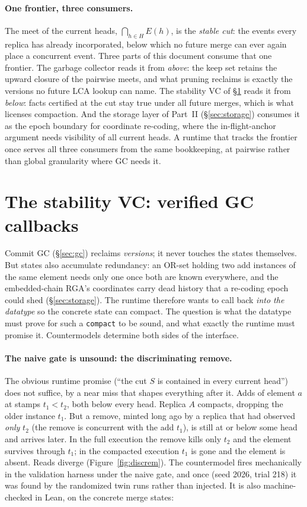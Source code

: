 \documentclass[11pt]{article}
\newcommand{\code}[1]{\texttt{#1}}
\begin{document}
\paragraph{One frontier, three consumers.} The meet of the current
heads, $\bigcap_{h \in H} E(h)$, is the \emph{stable cut}: the events
every replica has already incorporated, below which no future merge can
ever again place a concurrent event. Three parts of this document
consume that one frontier. The garbage collector reads it from
\emph{above}: the keep set retains the upward closure of the pairwise
meets, and what pruning reclaims is exactly the versions no future LCA
lookup can name. The stability VC of \S\ref{sec:stability} reads it
from \emph{below}: facts certified at the cut stay true under all
future merges, which is what licenses compaction. And the storage layer
of Part~II (\S\ref{sec:storage}) consumes it as the epoch boundary for
coordinate re-coding, where the in-flight-anchor argument needs
visibility of all current heads. A runtime that tracks the frontier
once serves all three consumers from the same bookkeeping, at pairwise
rather than global granularity where GC needs it.

\section{The stability VC: verified GC callbacks}
\label{sec:stability}

Commit GC (\S\ref{sec:gc}) reclaims \emph{versions}; it never touches
the states themselves. But states also accumulate redundancy: an OR-set
holding two add instances of the same element needs only one once both
are known everywhere, and the embedded-chain RGA's coordinates carry
dead history that a re-coding epoch could shed (\S\ref{sec:storage}).
The runtime therefore wants to call back \emph{into the datatype} so
the concrete state can compact. The question is what the datatype must
prove for such a \code{compact} to be sound, and what exactly the
runtime must promise it. Countermodels determine both sides of the
interface.

\paragraph{The naive gate is unsound: the discriminating remove.} The
obvious runtime promise (``the cut $S$ is contained in every current
head'') does not suffice, by a near miss that shapes everything after
it. Adds of element $a$ at stamps $t_1 < t_2$, both below every head.
Replica $A$ compacts, dropping the older instance $t_1$. But a remove,
minted long ago by a replica that had observed \emph{only} $t_2$ (the
remove is concurrent with the add $t_1$), is still at or below some
head and arrives later. In the full execution the remove kills only
$t_2$ and the element survives through $t_1$; in the compacted
execution $t_1$ is gone and the element is absent. Reads diverge
(Figure~\ref{fig:discrem}). The countermodel fires mechanically in the
validation harness under the naive gate, and once (seed 2026, trial
218) it was found by the randomized twin runs rather than injected. It
is also machine-checked in Lean, on the concrete merge states:
\end{document}
